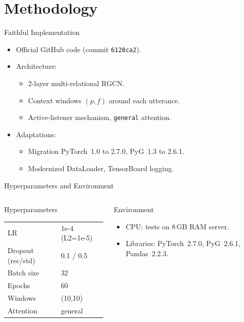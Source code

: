 \documentclass[10pt,aspectratio=169]{beamer}
\begin{document}
\section{Methodology}
\begin{frame}{Faithful Implementation}
  \begin{itemize}
    \item Official GitHub code (commit \texttt{6128ca2}).
    \item Architecture:
      \begin{itemize}
        \item 2-layer multi-relational RGCN.
        \item Context windows $(p,f)$ around each utterance.
        \item Active-listener mechanism, \texttt{general} attention.
      \end{itemize}
    \item Adaptations:
      \begin{itemize}
        \item Migration PyTorch~1.0 to 2.7.0, PyG~1.3 to 2.6.1.
        \item Modernized DataLoader, TensorBoard logging.
      \end{itemize}
  \end{itemize}
\end{frame}

\begin{frame}{Hyperparameters and Environment}
  \begin{columns}
    \begin{block}{Hyperparameters}
      \small
      \begin{tabular}{ll}
        LR & 1e-4 (L2=1e-5) \\
        Dropout (rec/std) & 0.1 / 0.5 \\
        Batch size & 32 \\
        Epochs & 60 \\
        Windows & (10,10) \\
        Attention & general \\
      \end{tabular}
    \end{block}
    \begin{block}{Environment}
      \begin{itemize}
        \item CPU: tests on 8\,GB RAM server.
        \item Libraries: PyTorch~2.7.0, PyG~2.6.1, Pandas~2.2.3.
      \end{itemize}
    \end{block}
  \end{columns}
\end{frame}
\end{document}

